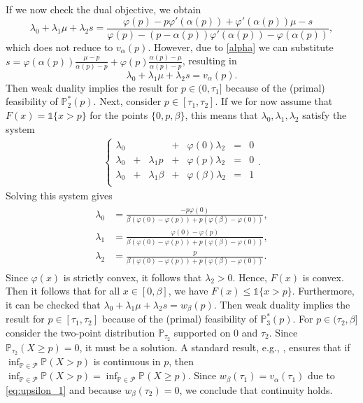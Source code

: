 \documentclass[11pt]{article}
\newcommand{\bP}{\mathbb{P}}
\newcommand{\cP}{\mathcal{P}}
\newcommand{\1}{\mathds{1}}
\begin{document}
If we now check the dual objective, we obtain $$\lambda_0 + \lambda_1 \mu + \lambda_2 s = \frac{\varphi(p)-p\varphi'(\alpha(p))+\varphi'(\alpha(p))\mu-s}{\varphi(p)-(p-\alpha(p))\varphi'(\alpha(p))-\varphi(\alpha(p))},$$ which does not reduce to $v_\alpha(p)$. However, due to \eqref{alpha} we can substitute $s = \varphi(\alpha(p)) \frac{\mu-p}{\alpha(p)-p}+\varphi(p)\frac{\alpha(p)-\mu}{\alpha(p)-p}$, resulting in $$\lambda_0 + \lambda_1 \mu + \lambda_2 s = v_\alpha(p).$$ Then weak duality implies the result for $p \in (0,\tau_1]$ because of the (primal) feasibility of $\bP^*_2(p)$.
Next, consider $p \in [\tau_1,\tau_2]$. 
If we for now assume that $F(x) = \1{\{x > p\}}$ for the points $\{0,p,\beta\}$, this means that $\lambda_0, \lambda_1, \lambda_2$ satisfy the system
\begin{align}
    \left\{
\begin{array}{rrrrrrr}
     \lambda_0 & &  & + & \varphi(0) \lambda_2  &= & 0 \\
      \lambda_0 & + &\lambda_1 p  & + & \varphi(p) \lambda_2  &= & 0 \\
  \lambda_0 & + &\lambda_1 \beta  & + & \varphi(\beta) \lambda_2  &= & 1 \\
\end{array}\right..
\label{eq:equations_dual}
\end{align}
Solving this system gives
\begin{align}
\begin{array}{ll}
 \lambda_0 & = \displaystyle \frac{-p\varphi(0)}{\beta(\varphi(0) - \varphi(p)) + p(\varphi(\beta) - \varphi(0))},\\[3.5ex] 
        \lambda_1 & = \displaystyle  \frac{\varphi(0)-\varphi(p)}{\beta(\varphi(0) - \varphi(p)) + p(\varphi(\beta) - \varphi(0))},  \\[3.5ex] 
        \lambda_2 & = \displaystyle  \frac{p}{\beta(\varphi(0) - \varphi(p)) + p(\varphi(\beta) - \varphi(0))}.
\end{array}
\label{eq:dual_variables} 
\end{align}
Since $\varphi(x)$ is strictly convex, it follows that $\lambda_2 > 0$. Hence, $F(x)$ is convex. Then it follows that for all $x \in [0,\beta]$, we have $F(x) \leq \1{\{x > p\}}$. Furthermore, it can be checked that $\lambda_0 + \lambda_1 \mu + \lambda_2 s = w_\beta(p)$. Then weak duality implies the result for $p \in [\tau_1,\tau_2]$ because of the (primal) feasibility of $\bP^*_3(p)$. For $p \in (\tau_2,\beta]$ consider the two-point distribution $\bP_{\tau_2}$ supported on $0$ and $\tau_2$. Since $\bP_{\tau_2}(X\geq p)=0$, it must be a solution.
A standard result, e.g., \cite[Lemma A1]{van2024robust}, ensures that if $\inf_{\bP \in \cP}\bP(X > p)$ is continuous in $p$, then $\inf_{\bP \in \cP}\bP(X > p) = \inf_{\bP \in \cP}\bP(X \geq p)$. Since $w_{\beta}(\tau_1) = v_{\alpha}(\tau_1)$ due to \eqref{eq:upsilon_1} and because $w_{\beta}(\tau_2) = 0$, we conclude that continuity holds.
\end{document}
